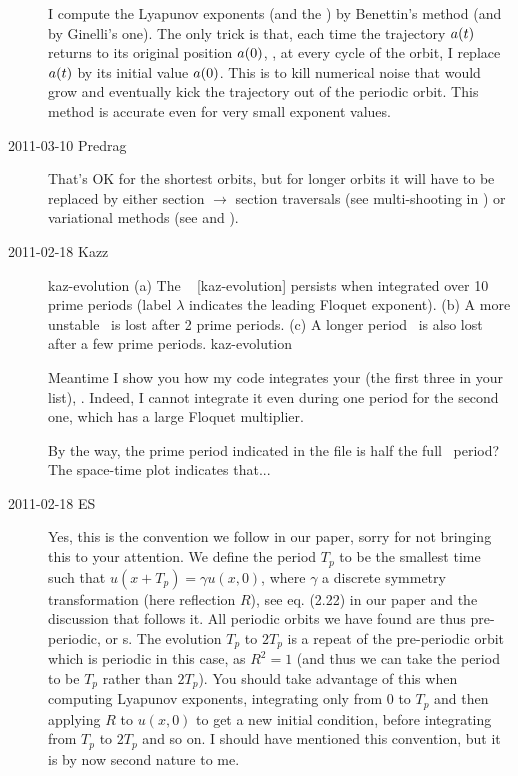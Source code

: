 \begin{description}
  I compute the Lyapunov exponents (and the {\cLvs})
  by Benettin's method (and by Ginelli's one). The only trick is that, each time
  the trajectory $\ssp(t)$ returns to its original position $\ssp(0)$, \ie, at every cycle
  of the orbit, I replace $\ssp(t)$ by its initial value $\ssp(0)$. This is to kill
  numerical noise that would grow and eventually kick the trajectory
  out of the periodic orbit. This method is accurate even for very small
  exponent values.

  \renewcommand{\ssp}{a}

\item[2011-03-10 Predrag] That's OK for the shortest orbits, but
  for longer orbits it will have to be replaced by either section $\to$
  section traversals (see multi-shooting in
  ) or variational methods (see
   and
  ).

\item[2011-02-18 Kazz]

  {kaz-evolution}   %
  {}   %
  {    %
    (a) The \po\  [kaz-evolution]
    persists when integrated over 10 prime periods (label $\lambda$
    indicates the leading Floquet exponent). (b) A more unstable
    \po\ is lost after 2 prime periods. (c) A longer
    period \po\ is also lost after a few prime periods.
  }
  {kaz-evolution}   %


  Meantime I show you how my code integrates your {\po}
  (the first three in your
  list), . Indeed, I cannot integrate
  it even during one period for the second one, which has a large
  Floquet multiplier.

  By the way, the prime period indicated in the file is half the
  full \statesp\ period?
  The space-time plot indicates that...

\item[2011-02-18 ES]
  Yes, this is the convention we follow in our paper, sorry for not
  bringing this to your attention. We define the period $T_p$ to be the
  smallest time such that $u(x+T_p)=\gamma u(x,0)$, where $\gamma$ a
  discrete symmetry transformation (here reflection $R$), see eq. (2.22) in
  our paper and the discussion that follows it. All periodic orbits we
  have found are thus pre-periodic, or \rpo s.
  The evolution
  $T_p$ to $2T_p$ is a repeat of the pre-periodic orbit which
  is periodic in this case, as $R^2=1$ (and thus we can take the period to be $T_p$
  rather than $2T_p$). You should take advantage of this
  when computing Lyapunov exponents, integrating only from $0$ to $T_p$ and
  then applying $R$ to $u(x,0)$ to get a new initial condition, before
  integrating from $T_p$ to $2T_p$ and so on. I should have mentioned this
  convention, but it is by now second nature to me.


\end{description}
